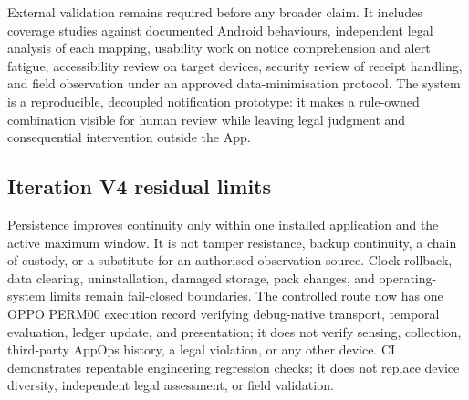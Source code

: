 External validation remains required before any broader claim. It includes coverage studies against documented Android behaviours, independent legal analysis of each mapping, usability work on notice comprehension and alert fatigue, accessibility review on target devices, security review of receipt handling, and field observation under an approved data-minimisation protocol. The system is a reproducible, decoupled notification prototype: it makes a rule-owned combination visible for human review while leaving legal judgment and consequential intervention outside the App.

\subsection{Iteration V4 residual limits}

Persistence improves continuity only within one installed application and the active maximum window. It is not tamper resistance, backup continuity, a chain of custody, or a substitute for an authorised observation source. Clock rollback, data clearing, uninstallation, damaged storage, pack changes, and operating-system limits remain fail-closed boundaries. The controlled route now has one OPPO PERM00 execution record verifying debug-native transport, temporal evaluation, ledger update, and presentation; it does not verify sensing, collection, third-party AppOps history, a legal violation, or any other device. CI demonstrates repeatable engineering regression checks; it does not replace device diversity, independent legal assessment, or field validation.
